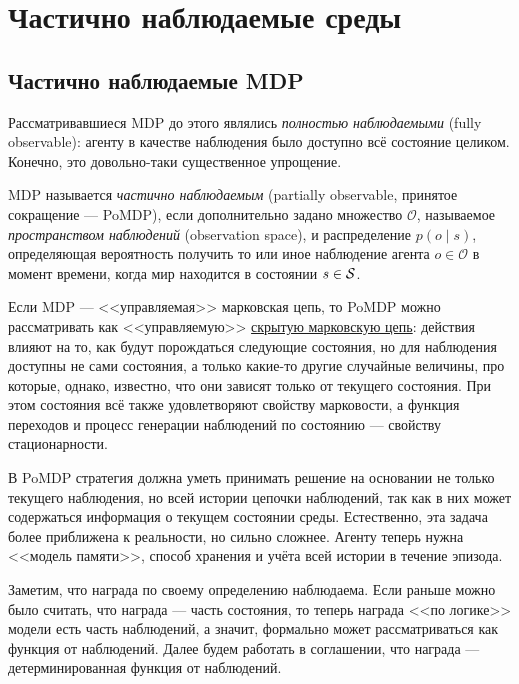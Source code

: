 \section{Частично наблюдаемые среды}\label{sec:PoMDP}

\subsection{Частично наблюдаемые MDP}

Рассматривавшиеся MDP до этого являлись \emph{полностью наблюдаемыми} (fully observable): агенту в качестве наблюдения было доступно всё состояние целиком. Конечно, это довольно-таки существенное упрощение.

\begin{definition}
MDP называется \emph{частично наблюдаемым} (partially observable, принятое сокращение --- PoMDP), если дополнительно задано множество $\mathcal{O}$, называемое \emph{пространством наблюдений} (observation space), и распределение $p(o \mid s)$, определяющая вероятность получить то или иное наблюдение агента $o \in \mathcal{O}$ в момент времени, когда мир находится в состоянии $s \in \mathcal{S}$.
\end{definition}

Если MDP --- <<управляемая>> марковская цепь, то PoMDP можно рассматривать как <<управляемую>> \href{https://en.wikipedia.org/wiki/Hidden_Markov_model}{скрытую марковскую цепь}: действия влияют на то, как будут порождаться следующие состояния, но для наблюдения доступны не сами состояния, а только какие-то другие случайные величины, про которые, однако, известно, что они зависят только от текущего состояния. При этом состояния всё также удовлетворяют свойству марковости, а функция переходов и процесс генерации наблюдений по состоянию --- свойству стационарности.

В PoMDP стратегия должна уметь принимать решение на основании не только текущего наблюдения, но всей истории цепочки наблюдений, так как в них может содержаться информация о текущем состоянии среды. Естественно, эта задача более приближена к реальности, но сильно сложнее. Агенту теперь нужна <<модель памяти>>, способ хранения и учёта всей истории в течение эпизода.

Заметим, что награда по своему определению наблюдаема. Если раньше можно было считать, что награда --- часть состояния, то теперь награда <<по логике>> модели есть часть наблюдений, а значит, формально может рассматриваться как функция от наблюдений. Далее будем работать в соглашении, что награда --- детерминированная функция от наблюдений.

